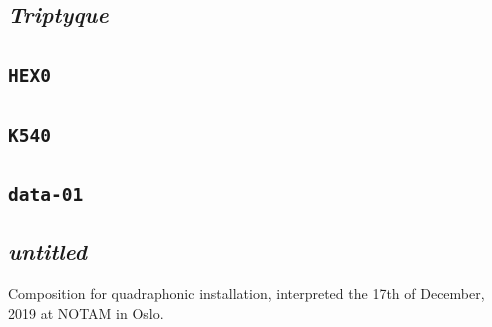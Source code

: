 \documentclass{book}
\begin{document}
\makeatletter
{}
\makeatother

\begin{mdframed}[style=stylesec]
\section{\textit{Triptyque}}
\label{tript}
\smallskip
\end{mdframed}


\newpage

\begin{mdframed}[style=stylesec]
\section{\texttt{HEX0}}
\label{hex0}
\smallskip
\end{mdframed}


\bigskip
 
\begin{mdframed}[style=stylesec]
\section{\texttt{K540}}
\label{k540}
\smallskip
\end{mdframed}


\bigskip
\bigskip

\begin{mdframed}[style=stylesec]
\section{\texttt{data-01}}
\label{d01}
\smallskip
\end{mdframed}


\bigskip
\bigskip

\begin{mdframed}[style=stylesec]
\section{\textit{untitled}}
\label{scp}
\smallskip
\end{mdframed}

\bigskip

Composition for quadraphonic installation, interpreted the 17th of December, 2019 at NOTAM in Oslo.

\bigskip
\end{document}
